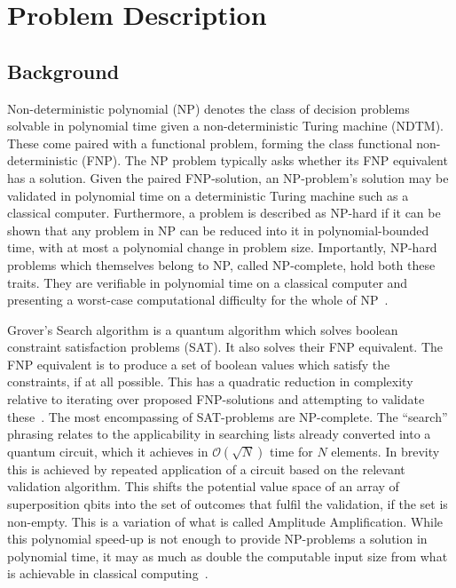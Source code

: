 \documentclass[msc,lith,english]{liuthesis}
\author{\parbox{\textwidth}{Emil Segerbäck\\ Olav Övrebö}}
\begin{document}
\chapter{Problem Description}
\section{Background}
Non-deterministic polynomial (NP) denotes the class of decision problems solvable in polynomial time given a non-deterministic Turing machine (NDTM). These come paired with a functional problem, forming the class functional non-deterministic (FNP). The NP problem typically asks whether its FNP equivalent has a solution. Given the paired FNP-solution, an NP-problem's solution may be validated in polynomial time on a deterministic Turing machine such as a classical computer. Furthermore, a problem is described as NP-hard if it can be shown that any problem in NP can be reduced into it in polynomial-bounded time, with at most a polynomial change in problem size. Importantly, NP-hard problems which themselves belong to NP, called NP-complete, hold both these traits. They are verifiable in polynomial time on a classical computer and presenting a worst-case computational difficulty for the whole of NP~\cite{CCAMA}.

Grover’s Search algorithm is a quantum algorithm which solves boolean constraint satisfaction problems (SAT). It also solves their FNP equivalent. The FNP equivalent is to produce a set of boolean values which satisfy the constraints, if at all possible. This has a quadratic reduction in complexity relative to iterating over proposed FNP-solutions and attempting to validate these~\cite{QCQI}\cite{CCAMA}. The most encompassing of SAT-problems are NP-complete. The “search” phrasing relates to the applicability in searching lists already converted into a quantum circuit, which it achieves in $\mathcal{O}(\sqrt{N})$ time for $N$ elements. In brevity this is achieved by repeated application of a circuit based on the relevant validation algorithm. This shifts the potential value space of an array of superposition qbits into the set of outcomes that fulfil the validation, if the set is non-empty. This is a variation of what is called Amplitude Amplification. While this polynomial speed-up is not enough to provide NP-problems a solution in polynomial time, it may as much as double the computable input size from what is achievable in classical computing~\cite{EIQC}.
\end{document}
